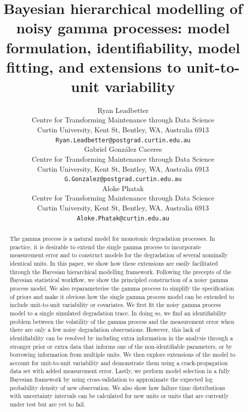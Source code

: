 \documentclass{article}
\title{Bayesian hierarchical modelling of noisy gamma processes: model formulation, identifiability, model fitting, and extensions to unit-to-unit variability}
\author{
 Ryan Leadbetter \\
  Centre for Transforming Maintenance through Data Science\\
  Curtin University, Kent St, Bentley, WA, Australia 6913 \\
  \texttt{Ryan.Leadbetter@postgrad.curtin.edu.au} \\
   \And
 Gabriel Gonz\'{a}lez Caceres \\
  Centre for Transforming Maintenance through Data Science\\
  Curtin University, Kent St, Bentley, WA, Australia 6913 \\
  \texttt{G.Gonzalez@postgrad.curtin.edu.au} \\
  \And
 Aloke Phatak \\
  Centre for Transforming Maintenance through Data Science\\
  Curtin University, Kent St, Bentley, WA, Australia 6913 \\
  \texttt{Aloke.Phatak@curtin.edu.au} \\
}
\begin{document}
\maketitle
\begin{abstract}

The gamma process is a natural model for monotonic degradation processes. In practice, it is desirable to extend the single gamma process to incorporate measurement error and to construct models for the degradation of several nominally identical units. In this paper, we show how these extensions are easily facilitated through the Bayesian hierarchical modelling framework. Following the precepts of the Bayesian statistical workflow, we show the principled construction of a noisy gamma process model. We also reparameterise the gamma process to simplify the specification of priors and make it obvious how the single gamma process model can be extended to include unit-to-unit variability or covariates. We first fit the noisy gamma process model to a single simulated degradation trace. In doing so, we find an identifiability problem between the volatility of the gamma process and the measurement error when there are only a few noisy degradation observations. However, this lack of identifiability can be resolved by including extra information in the analysis through a stronger prior or extra data that informs one of the non-identifiable parameters, or by borrowing information from multiple units. We then explore extensions of the model to account for unit-to-unit variability and demonstrate them using a crack-propagation data set with added measurement error. Lastly, we perform model selection in a fully Bayesian framework by using cross-validation to approximate the expected log probability density of new observation. We also show how failure time distributions with uncertainty intervals can be calculated for new units or units that are currently under test but are yet to fail.

\end{abstract}



\newpage

\tableofcontents

\newpage
\end{document}
